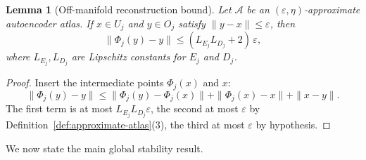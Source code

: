 \documentclass[11pt]{article}
\theoremstyle{plain}
\newtheorem{lemma}[theorem]{Lemma}
\theoremstyle{definition}
\theoremstyle{remark}
\begin{document}
\begin{lemma}[Off-manifold reconstruction bound]\label{lem:off-manifold-reconstruction}
Let $\mathcal{A}$ be an $(\varepsilon,\eta)$-approximate autoencoder atlas. If $x \in U_j$ and $y \in O_j$ satisfy $\|y - x\| \leq \varepsilon$, then
\[
\|\Phi_j(y) - y\| \leq (L_{E_j} L_{D_j} + 2)\,\varepsilon,
\]
where $L_{E_j}, L_{D_j}$ are Lipschitz constants for $E_j$ and $D_j$.
\end{lemma}
\begin{proof}
Insert the intermediate points $\Phi_j(x)$ and $x$:
\[
\|\Phi_j(y) - y\| \leq \|\Phi_j(y) - \Phi_j(x)\| + \|\Phi_j(x) - x\| + \|x - y\|.
\]
The first term is at most $L_{E_j} L_{D_j} \varepsilon$, the second at most $\varepsilon$ by Definition~\ref{def:approximate-atlas}(3), the third at most $\varepsilon$ by hypothesis.
\end{proof}

We now state the main global stability result.
\end{document}
